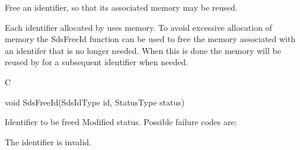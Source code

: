 \begin{manroutinedescription}
      Free an identifier, so that its associated memory may be reused.

      Each identifier allocated by {} uses memory. To avoid excessive
      allocation of memory the SdsFreeId function can be used to free
      the memory associated with an identifer that is no longer needed.
      When this is done the memory will be reused by {} for a %
subsequent
      identifier when needed.

      C

      void SdsFreeId(SdsIdType id, StatusType {\mantt{*}} {} %
status)

\begin{manparametertable}
  Identifier to be freed
 Modified status. Possible %
failure codes are:
\end{manparametertable}
\begin{mantwocolumntable}
The identifier is invalid.
\end{mantwocolumntable}
 
\end{manroutinedescription}
